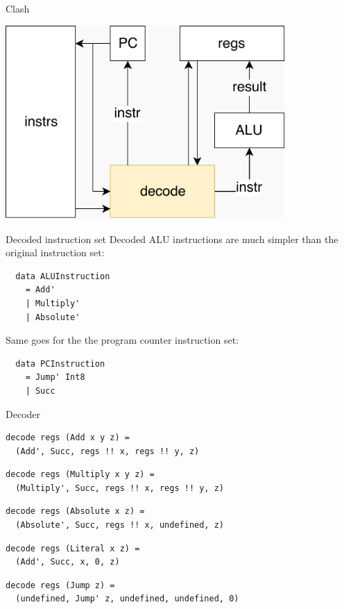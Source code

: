 \documentclass[10pt]{beamer}
\begin{document}
\begin{frame}[fragile]{Clash}
\begin{center}
\includegraphics[width=0.8\textwidth]{img/CPU-decode.pdf}
\end{center}
\end{frame}

\begin{frame}[fragile]{Decoded instruction set}
Decoded ALU instructions are much simpler than the original instruction set:

  \begin{verbatim}
  data ALUInstruction
    = Add' 
    | Multiply' 
    | Absolute'
  \end{verbatim}
\pause
  
Same goes for the the program counter instruction set:
  
  \begin{verbatim}
  data PCInstruction
    = Jump' Int8
    | Succ
  \end{verbatim}
\end{frame}

\begin{frame}[fragile]{Decoder}
\begin{verbatim}
decode regs (Add x y z) = 
  (Add', Succ, regs !! x, regs !! y, z)
\end{verbatim}

\pause

\begin{verbatim}
decode regs (Multiply x y z) = 
  (Multiply', Succ, regs !! x, regs !! y, z)
\end{verbatim}

\pause

\begin{verbatim}
decode regs (Absolute x z) = 
  (Absolute', Succ, regs !! x, undefined, z)
\end{verbatim}

\pause

\begin{verbatim}
decode regs (Literal x z) = 
  (Add', Succ, x, 0, z)
\end{verbatim}

\pause

\begin{verbatim}
decode regs (Jump z) = 
  (undefined, Jump' z, undefined, undefined, 0)
\end{verbatim}
\end{frame}
\end{document}

